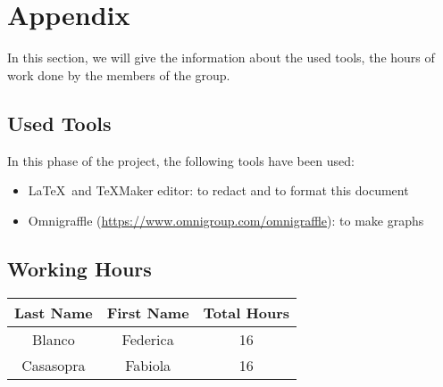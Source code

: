 \section{Appendix} \label{sec:app}
In this section, we will give the information about the used tools, the hours of work done by the members of the group.

\subsection{Used Tools} \label{tools}

In this phase of the project, the following tools have been used:

\begin{itemize}
	\item \LaTeX\ and TeXMaker editor: to redact and to format this document
	\item Omnigraffle (\url{https://www.omnigroup.com/omnigraffle}): to make graphs
\end{itemize}

\subsection{Working Hours} \label{worked}

\begin{table}[htbp]
\begin{center}
\begin{tabular}[t]{ccc}

\hline
\textbf{Last Name} & \textbf{First Name} & \textbf{Total Hours} \\
\hline
Blanco & Federica &  16\\
\hline
Casasopra & Fabiola &  16\\
\hline

\end{tabular}
\end{center}
\end{table}



